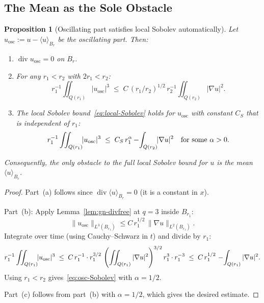 \documentclass[11pt]{article}
\newtheorem{proposition}[theorem]{Proposition}
\theoremstyle{definition}
\theoremstyle{remark}
\newcommand{\Xint}{\mathop{\mathchoice{\vcenter{\hbox{$\displaystyle-$}}}%
  {\vcenter{\hbox{$\textstyle-$}}}%
  {\vcenter{\hbox{$\scriptstyle-$}}}%
  {\vcenter{\hbox{$\scriptscriptstyle-$}}}}\!\int}
\begin{document}
\subsection{The Mean as the Sole Obstacle}

\begin{proposition}[Oscillating part satisfies local Sobolev automatically]
\label{prop:mean-obstacle}
  Let $u_{\mathrm{osc}} := u - \langle u\rangle_{B_r}$ be the oscillating part.
  Then:
  \begin{enumerate}
    \item[(a)] $\operatorname{div} u_{\mathrm{osc}} = 0$ on $B_r$.
    \item[(b)] For any $r_1 < r_2$ with $2r_1 < r_2$:
      \begin{equation}\label{eq:osc-Sobolev}
        r_1^{-1}\iint_{Q(r_1)}\!\!|u_{\mathrm{osc}}|^3
        \;\leq\; C\,(r_1/r_2)^{1/2}\,r_2^{-1}\iint_{Q(r_2)}\!\!|\nabla u|^2.
      \end{equation}
    \item[(c)] The local Sobolev bound~\eqref{eq:local-Sobolev} holds for $u_{\mathrm{osc}}$
      with constant $C_S$ that is \emph{independent} of $r_1$:
      \begin{equation}\label{eq:osc-local-Sobolev}
        r_1^{-1}\iint_{Q(r_1)}\!\!|u_{\mathrm{osc}}|^3
        \;\leq\; C_S\,r_1^{\alpha}\Xint_{Q(r_2)}\!\!|\nabla u|^2
        \quad\text{for some }\alpha>0.
      \end{equation}
  \end{enumerate}
  Consequently, the \emph{only} obstacle to the full local Sobolev bound for $u$
  is the mean $\langle u\rangle_{B_r}$.
\end{proposition}

\begin{proof}
  Part~(a) follows since $\operatorname{div}\langle u\rangle_{B_r}=0$ (it is a constant in $x$).

  Part~(b): Apply Lemma~\ref{lem:gn-divfree} at $q=3$ inside $B_{r_1}$:
  \[
    \|u_{\mathrm{osc}}\|_{L^3(B_{r_1})}
    \leq C\,r_1^{1/2}\,\|\nabla u\|_{L^2(B_{r_1})}.
  \]
  Integrate over time (using Cauchy--Schwarz in $t$) and divide by $r_1$:
  \[
    r_1^{-1}\iint_{Q(r_1)}\!\!|u_{\mathrm{osc}}|^3
    \;\leq\; C\,r_1^{-1}\cdot r_1^{3/2}\,\left(\iint_{Q(r_1)}|\nabla u|^2\right)^{3/2}
    r_1^{3} \cdot r_1^{-3}
    \;\leq\; C\,r_1^{1/2}\,\Xint_{Q(r_1)}|\nabla u|^2.
  \]
  Using $r_1 < r_2$ gives~\eqref{eq:osc-Sobolev} with $\alpha=1/2$.

  Part~(c) follows from part~(b) with $\alpha=1/2$, which gives the desired estimate.
\end{proof}
\end{document}
